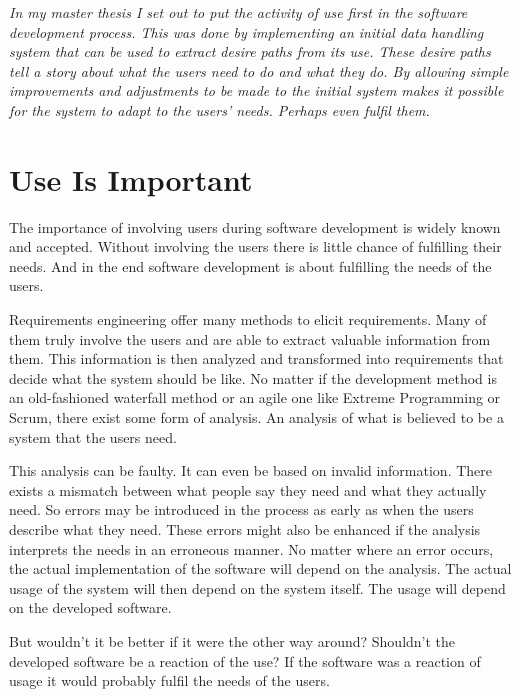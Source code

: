 \documentclass[a4paper]{article}
\begin{document}
\setlength{\columnsep}{1cm}
\begin{multicols}{2}
	
{ \itshape
	In my master thesis I set out to put the activity of use first in the software development process. This was done by implementing an initial data handling system that can be used to extract desire paths from its use. These desire paths tell a story about what the users need to do and what they do. By allowing simple improvements and adjustments to be made to the initial system makes it possible for the system to adapt to the users' needs. Perhaps even fulfil them.
}
	
\section*{Use Is Important}
The importance of involving users during software development is widely known and accepted. Without involving the users there is little chance of fulfilling their needs. And in the end software development is about fulfilling the needs of the users.

Requirements engineering offer many methods to elicit requirements. Many of them truly involve the users and are able to extract valuable information from them. This information is then analyzed and transformed into requirements that decide what the system should be like. No matter if the development method is an old-fashioned waterfall method or an agile one like Extreme Programming or Scrum, there exist some form of analysis. An analysis of what is believed to be a system that the users need.

This analysis can be faulty. It can even be based on invalid information. There exists a mismatch between what people say they need and what they actually need. So errors may be introduced in the process as early as when the users describe what they need. These errors might also be enhanced if the analysis interprets the needs in an erroneous manner. No matter where an error occurs, the actual implementation of the software will depend on the analysis. The actual usage of the system will then depend on the system itself. The usage will depend on the developed software.

But wouldn't it be better if it were the other way around? Shouldn't the developed software be a reaction of the use? If the software was a reaction of usage it would probably fulfil the needs of the users.


\end{multicols}
\end{document}
